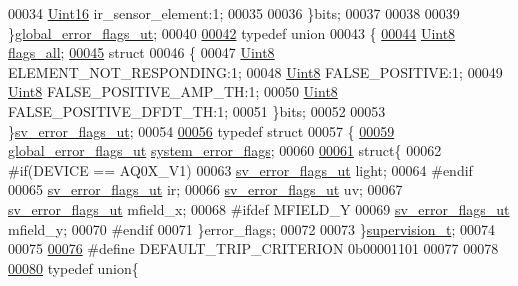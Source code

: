 \begin{DoxyCode}
00034         \hyperlink{a00072_a59a9f6be4562c327cbfb4f7e8e18f08b}{Uint16} ir\_sensor\_element:1;
00035 
00036     \}bits;
00037 
00038 
00039 \}\hyperlink{a00022_d1/d0b/a00452}{global\_error\_flags\_ut};
00040 
\hypertarget{a00022_source_l00042}{}\hyperlink{a00022}{00042} \textcolor{keyword}{typedef} \textcolor{keyword}{union}
00043 \{
\hypertarget{a00022_source_l00044}{}\hyperlink{a00022_a1caa87b00c878186140c3bac9c8acf3b}{00044}      \hyperlink{a00072_af84840501dec18061d18a68c162a8fa2}{Uint8} \hyperlink{a00022_a1caa87b00c878186140c3bac9c8acf3b}{flags\_all};
\hypertarget{a00022_source_l00045}{}\hyperlink{a00022}{00045}     \textcolor{keyword}{struct}
00046     \{
00047         \hyperlink{a00072_af84840501dec18061d18a68c162a8fa2}{Uint8} ELEMENT\_NOT\_RESPONDING:1;
00048         \hyperlink{a00072_af84840501dec18061d18a68c162a8fa2}{Uint8} FALSE\_POSITIVE:1;
00049         \hyperlink{a00072_af84840501dec18061d18a68c162a8fa2}{Uint8} FALSE\_POSITIVE\_AMP\_TH:1;
00050         \hyperlink{a00072_af84840501dec18061d18a68c162a8fa2}{Uint8} FALSE\_POSITIVE\_DFDT\_TH:1;
00051     \}bits;
00052 
00053 \}\hyperlink{a00022_d2/d5a/a00792}{sv\_error\_flags\_ut};
00054 
\hypertarget{a00022_source_l00056}{}\hyperlink{a00022}{00056} \textcolor{keyword}{typedef} \textcolor{keyword}{struct}
00057 \{
\hypertarget{a00022_source_l00059}{}\hyperlink{a00022_af01cfb308e496b8084778ac0315c9ccc}{00059}   \hyperlink{a00022_d1/d0b/a00452}{global\_error\_flags\_ut}     \hyperlink{a00022_af01cfb308e496b8084778ac0315c9ccc}{system\_error\_flags};
00060 
\hypertarget{a00022_source_l00061}{}\hyperlink{a00022}{00061}   \textcolor{keyword}{struct}\{
00062 \textcolor{preprocessor}{#if(DEVICE == AQ0X\_V1)}
00063    \hyperlink{a00022_d2/d5a/a00792}{sv\_error\_flags\_ut}        light;
00064 \textcolor{preprocessor}{#endif}
00065    \hyperlink{a00022_d2/d5a/a00792}{sv\_error\_flags\_ut}        ir;
00066    \hyperlink{a00022_d2/d5a/a00792}{sv\_error\_flags\_ut}        uv;
00067    \hyperlink{a00022_d2/d5a/a00792}{sv\_error\_flags\_ut}        mfield\_x;
00068 \textcolor{preprocessor}{#ifdef MFIELD\_Y}
00069    \hyperlink{a00022_d2/d5a/a00792}{sv\_error\_flags\_ut}        mfield\_y;
00070 \textcolor{preprocessor}{#endif}
00071   \}error\_flags;
00072 
00073 \}\hyperlink{a00022_d3/daf/a00790}{supervision\_t};
00074 
00075 
\hypertarget{a00022_source_l00076}{}\hyperlink{a00022_a0ff9495f8521ea7698e83e7b4d6a6985}{00076} \textcolor{preprocessor}{#define DEFAULT\_TRIP\_CRITERION   0b00001101}
00077 
00078 
\hypertarget{a00022_source_l00080}{}\hyperlink{a00022}{00080} \textcolor{keyword}{typedef}  \textcolor{keyword}{union}\{

\end{DoxyCode}
